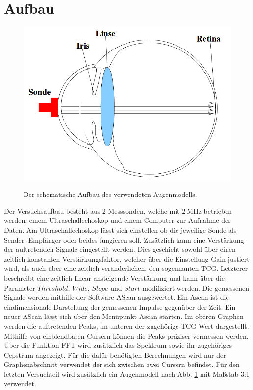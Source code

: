 \section{Aufbau}
\label{sec:Aufbau}

\begin{figure}
 \centering
 \caption{Der schematische Aufbau des verwendeten Augenmodells.\cite{US1}}
 \includegraphics[width=\linewidth-170pt,height=\textheight-170pt,keepaspectratio]{content/AUGE.png}
 \label{fig:auge}
\end{figure}

Der Versuchsaufbau besteht aus 2 Messsonden, welche mit $\SI{2}{\mega\hertz}$
betrieben werden, einem Ultraschallechoskop und einem Computer zur Aufnahme der Daten.
Am Ultraschallechoskop lässt sich einstellen ob die jeweilige Sonde als Sender,
Empfänger oder beides fungieren soll. Zusätzlich kann eine Verstärkung der
auftretenden Signale eingestellt werden. Dies geschieht sowohl über einen zeitlich konstanten Verstärkungsfaktor,
welcher über die Einstellung Gain justiert wird, als auch über eine zeitlich
veränderlichen, den sogennanten  TCG. Letzterer beschreibt eine zeitlich linear ansteigende Verstärkung
und kann über die Parameter $Threshold$, $Wide$, $Slope$ und $Start$
modifiziert werden. Die gemessenen Signale werden mithilfe der
Software AScan ausgewertet. Ein Ascan ist die eindimensionale Darstellung der gemessenen Impulse gegenüber der Zeit.
 Ein neuer AScan lässt sich über den Menüpunkt Ascan starten. Im oberen
Graphen werden die auftretenden Peaks, im unteren der zugehörige TCG Wert
dargestellt. Mithilfe von einblendbaren Cursern können die Peaks präziser vermessen
werden. Über die Funktion FFT wird zusätzlich das Spektrum sowie ihr zugehöriges
Cepstrum angezeigt. Für die dafür benötigten Berechnungen wird nur der
Graphenabschnitt verwendet der sich zwischen zwei Cursern befindet.
Für den letzten Versuchteil wird zusätzlich ein Augenmodell nach Abb. \ref{fig:auge} mit Maßstab 3:1 verwendet.
